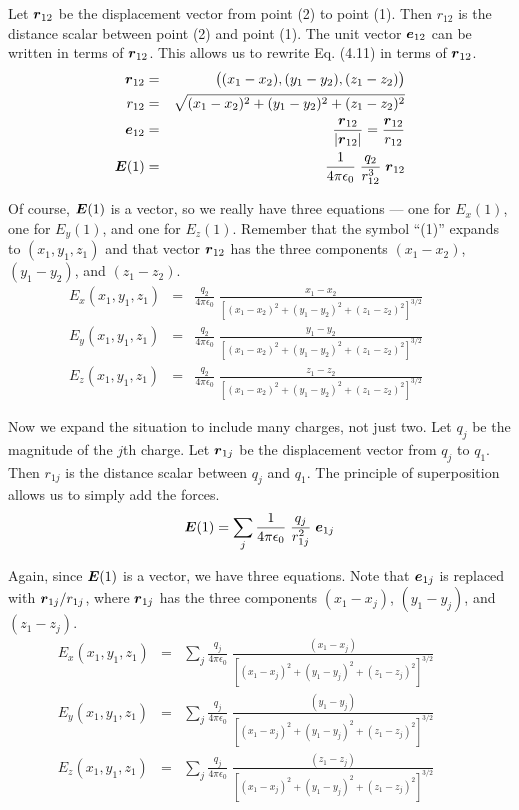 Let $\boldsymbol{r}_{12}$ be the displacement vector from point (2) to point (1).
Then $r_{12}$ is the distance scalar between point (2) and point (1).
The unit vector $\boldsymbol{e}_{12}$ can be written in terms of $\boldsymbol{r}_{12}$.
This allows us to rewrite Eq. (4.11) in terms of $\boldsymbol{r}_{12}$.
\begin{eqnarray*}
  \boldsymbol{r}_{12} &=& \big((x_1 - x_2), (y_1 - y_2), (z_1 - z_2)\big) \\
  r_{12} &=& \sqrt{(x_1 - x_2)^2 + (y_1 - y_2)^2 + (z_1 - z_2)^2} \\
  \boldsymbol{e}_{12} &=& \frac{\boldsymbol{r}_{12}}{|\boldsymbol{r}_{12}|} = \frac{\boldsymbol{r}_{12}}{r_{12}} \\
  \boldsymbol{E}(1) &=& \frac{1}{4\pi\epsilon_0} \; \frac{q_2}{r^3_{12}} \; \boldsymbol{r}_{12}
\end{eqnarray*}

Of course, $\boldsymbol{E}(1)$ is a vector, so we really have three equations ---
one for $E_x(1)$, one for $E_y(1)$, and one for $E_z(1)$.
Remember that the symbol ``(1)'' expands to $(x_1,y_1,z_1)$ and 
that vector $\boldsymbol{r}_{12}$ has the three components
$(x_1 - x_2)$, $(y_1 - y_2)$, and $(z_1 - z_2)$.
\begin{eqnarray}
  E_x (x_1,y_1,z_1) &=& \frac{q_2}{4\pi\epsilon_0} \; \frac{x_1 - x_2}
  {[(x_1 - x_2)^2 + (y_1 - y_2)^2 + (z_1 - z_2)^2]^{3/2}} \qquad \\
  E_y (x_1,y_1,z_1) &=& \frac{q_2}{4\pi\epsilon_0} \; \frac{y_1 - y_2}
  {[(x_1 - x_2)^2 + (y_1 - y_2)^2 + (z_1 - z_2)^2]^{3/2}} \nonumber\\
  E_z (x_1,y_1,z_1) &=& \frac{q_2}{4\pi\epsilon_0} \; \frac{z_1 - z_2}
  {[(x_1 - x_2)^2 + (y_1 - y_2)^2 + (z_1 - z_2)^2]^{3/2}} \nonumber
\end{eqnarray}

Now we expand the situation to include many charges, not just two.
Let $q_j$ be the magnitude of the $j$th charge.
Let $\boldsymbol{r}_{1j}$ be the displacement vector from $q_j$ to $q_1$.
Then $r_{1j}$ is the distance scalar between $q_j$ and $q_1$.
The principle of superposition allows us to simply add the forces.
\begin{equation}
  \boldsymbol{E}(1) = \sum_j \frac{1}{4\pi\epsilon_0} \; \frac{q_j}{r^2_{1j}} \; \boldsymbol{e}_{1j}
\end{equation}

Again, since $\boldsymbol{E}(1)$ is a vector, we have three equations.
Note that $\boldsymbol{e}_{1j}$ is replaced with $\boldsymbol{r}_{1j} / r_{1j}$,
where $\boldsymbol{r}_{1j}$ has the three components $(x_1 - x_j)$, $(y_1 - y_j)$, and $(z_1 - z_j)$.
\begin{eqnarray}
  E_x (x_1,y_1,z_1) &=& \sum_j \frac{q_j}{4\pi\epsilon_0} \; \frac{(x_1 - x_j)}
  {[(x_1 - x_j)^2 + (y_1 - y_j)^2 + (z_1 - z_j)^2]^{3/2}} \qquad \\
  E_y (x_1,y_1,z_1) &=& \sum_j \frac{q_j}{4\pi\epsilon_0} \; \frac{(y_1 - y_j)}
  {[(x_1 - x_j)^2 + (y_1 - y_j)^2 + (z_1 - z_j)^2]^{3/2}} \nonumber\\
  E_z (x_1,y_1,z_1) &=& \sum_j \frac{q_j}{4\pi\epsilon_0} \; \frac{(z_1 - z_j)}
  {[(x_1 - x_j)^2 + (y_1 - y_j)^2 + (z_1 - z_j)^2]^{3/2}} \nonumber
\end{eqnarray}

